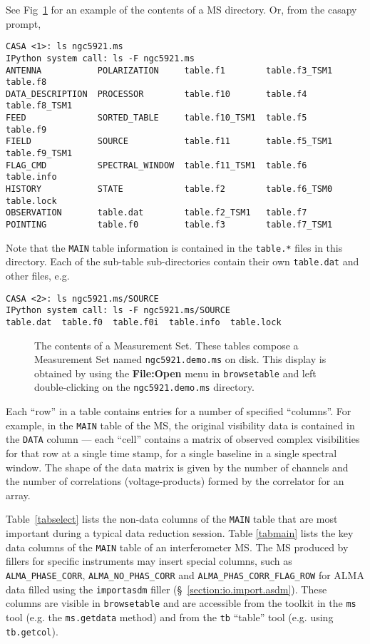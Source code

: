 See Fig~\ref{fig:tablekeyword} for an example of the contents of a MS
directory.  Or, from the casapy prompt,
\small
\begin{verbatim}
CASA <1>: ls ngc5921.ms
IPython system call: ls -F ngc5921.ms
ANTENNA           POLARIZATION     table.f1        table.f3_TSM1  table.f8
DATA_DESCRIPTION  PROCESSOR        table.f10       table.f4       table.f8_TSM1
FEED              SORTED_TABLE     table.f10_TSM1  table.f5       table.f9
FIELD             SOURCE           table.f11       table.f5_TSM1  table.f9_TSM1
FLAG_CMD          SPECTRAL_WINDOW  table.f11_TSM1  table.f6       table.info
HISTORY           STATE            table.f2        table.f6_TSM0  table.lock
OBSERVATION       table.dat        table.f2_TSM1   table.f7
POINTING          table.f0         table.f3        table.f7_TSM1
\end{verbatim}
\normalsize
Note that the {\tt MAIN} table information is contained in the
{\tt table.*} files in this directory.  Each of the sub-table
sub-directories contain their own {\tt table.dat} and other files, e.g.
\small
\begin{verbatim}
CASA <2>: ls ngc5921.ms/SOURCE
IPython system call: ls -F ngc5921.ms/SOURCE
table.dat  table.f0  table.f0i  table.info  table.lock
\end{verbatim}
\normalsize

\begin{figure}[h!]
\caption{\label{fig:tablekeyword} The contents of a Measurement
  Set. These tables compose a Measurement Set named {\tt ngc5921.demo.ms} on
  disk.  This display is obtained by using the {\bf File:Open} menu in
  {\tt browsetable} and left double-clicking on the {\tt ngc5921.demo.ms}
  directory.}
\hrulefill
\end{figure}

Each ``row'' in a table contains entries for a number of specified 
``columns''.  For example, in the {\tt MAIN} table of the MS, the
original visibility data is contained in the {\tt  DATA} column ---
each ``cell'' contains a matrix of observed
complex visibilities for that row at a single time stamp, for a single
baseline in a single spectral window.  The shape of the data matrix is
given by the number of channels and the number of correlations
(voltage-products) formed by the correlator for an array.  

Table~\ref{tabselect} lists the non-data columns of the {\tt MAIN}
table that are most important during a typical data reduction session.
Table \ref{tabmain} lists the key data columns of the {\tt MAIN} table
of an interferometer MS.  The MS produced by fillers for specific
instruments may insert special columns, such as
{\tt ALMA\_PHASE\_CORR}, {\tt ALMA\_NO\_PHAS\_CORR} and 
{\tt ALMA\_PHAS\_CORR\_FLAG\_ROW} for ALMA data filled using the 
{\tt importasdm} filler (\S~\ref{section:io.import.asdm}).
These columns are visible in {\tt browsetable} and are accessible from
the toolkit in the {\tt ms} tool (e.g. the {\tt ms.getdata} method)
and from the {\tt tb} ``table'' tool (e.g. using {\tt tb.getcol}).

